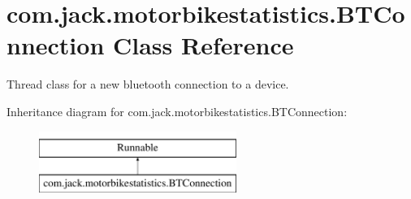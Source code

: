 \hypertarget{classcom_1_1jack_1_1motorbikestatistics_1_1_b_t_connection}{}\section{com.\+jack.\+motorbikestatistics.\+B\+T\+Connection Class Reference}
\label{classcom_1_1jack_1_1motorbikestatistics_1_1_b_t_connection}


Thread class for a new bluetooth connection to a device.  


Inheritance diagram for com.\+jack.\+motorbikestatistics.\+B\+T\+Connection\+:\begin{figure}[H]
\begin{center}
\leavevmode
\includegraphics[height=2.000000cm]{classcom_1_1jack_1_1motorbikestatistics_1_1_b_t_connection}
\end{center}
\end{figure}
